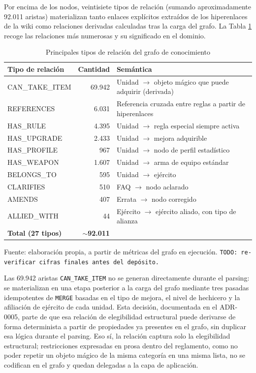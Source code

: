 \documentclass[11pt,a4paper,spanish]{book}
\numberwithin{equation}{chapter}
\numberwithin{figure}{chapter}
\numberwithin{table}{chapter}
\begin{document}
Por encima de los nodos, veintisiete tipos de relación (sumando aproximadamente 92.011 aristas) materializan tanto enlaces explícitos extraídos de los hiperenlaces de la wiki como relaciones derivadas calculadas tras la carga del grafo. La Tabla \ref{tab:grafo-aristas} recoge las relaciones más numerosas y su significado en el dominio.

\begin{table}[h]
\centering
{\fontsize{9}{11}\selectfont
\begin{tabular}{|l|r|p{6.5cm}|}
	\hline
	\textbf{Tipo de relación} & \textbf{Cantidad} & \textbf{Semántica} \\
	\hline
	CAN\_TAKE\_ITEM & 69.942 & Unidad $\rightarrow$ objeto mágico que puede adquirir (derivada) \\
	\hline
	REFERENCES & 6.031 & Referencia cruzada entre reglas a partir de hiperenlaces \\
	\hline
	HAS\_RULE & 4.395 & Unidad $\rightarrow$ regla especial siempre activa \\
	\hline
	HAS\_UPGRADE & 2.433 & Unidad $\rightarrow$ mejora adquirible \\
	\hline
	HAS\_PROFILE & 967 & Unidad $\rightarrow$ nodo de perfil estadístico \\
	\hline
	HAS\_WEAPON & 1.607 & Unidad $\rightarrow$ arma de equipo estándar \\
	\hline
	BELONGS\_TO & 595 & Unidad $\rightarrow$ ejército \\
	\hline
	CLARIFIES & 510 & FAQ $\rightarrow$ nodo aclarado \\
	\hline
	AMENDS & 407 & Errata $\rightarrow$ nodo corregido \\
	\hline
	ALLIED\_WITH & 44 & Ejército $\rightarrow$ ejército aliado, con tipo de alianza \\
	\hline
	\textbf{Total (27 tipos)} & \textbf{$\sim$92.011} & \\
	\hline
\end{tabular}
}
\caption{Principales tipos de relación del grafo de conocimiento}
\label{tab:grafo-aristas}
{\footnotesize\centering Fuente: elaboración propia, a partir de métricas del grafo en ejecución. \texttt{TODO: re-verificar cifras finales antes del depósito.}\par}
\end{table}

Las 69.942 aristas \texttt{CAN\_TAKE\_ITEM} no se generan directamente durante el parsing: se materializan en una etapa posterior a la carga del grafo mediante tres pasadas idempotentes de \texttt{MERGE} basadas en el tipo de mejora, el nivel de hechicero y la afiliación de ejército de cada unidad. Esta decisión, documentada en el ADR-0005, parte de que esa relación de elegibilidad estructural puede derivarse de forma determinista a partir de propiedades ya presentes en el grafo, sin duplicar esa lógica durante el parsing. Eso sí, la relación captura solo la elegibilidad estructural; restricciones expresadas en prosa dentro del reglamento, como no poder repetir un objeto mágico de la misma categoría en una misma lista, no se codifican en el grafo y quedan delegadas a la capa de aplicación.
\end{document}
